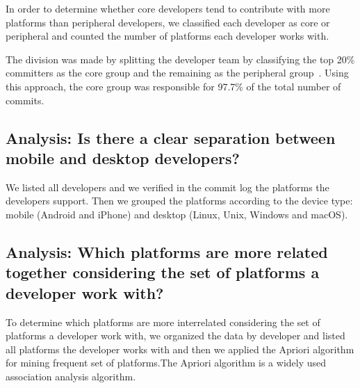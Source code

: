 \documentclass[10pt, conference]{IEEEtran}
\begin{document}
In order to determine whether core developers tend to contribute with more platforms than peripheral developers, we classified each developer as core or peripheral and counted the number of platforms each developer works with. 

The division was made by splitting the developer team by classifying the top 20\% committers as the core group and the remaining as the peripheral group~\cite{Robles2009}. Using this approach, the core group was responsible for 97.7\% of the total number of commits.

 

\subsection{Analysis: Is there a clear separation between mobile and desktop developers?}
\label{met_analysis2}



We listed all developers and we verified in the commit log the platforms the developers support. Then we grouped the platforms according to the device type: mobile (Android and iPhone) and desktop (Linux, Unix, Windows and macOS). %



\subsection{Analysis: Which platforms are more related together considering the set of platforms a developer work with? }
\label{met_analysis3}

To determine which platforms are more interrelated considering the set of platforms a developer work with, we organized the data by developer and listed all platforms the developer works with and then we applied the Apriori algorithm for mining frequent set of platforms.The Apriori algorithm is a widely used association analysis algorithm. 
\end{document}
